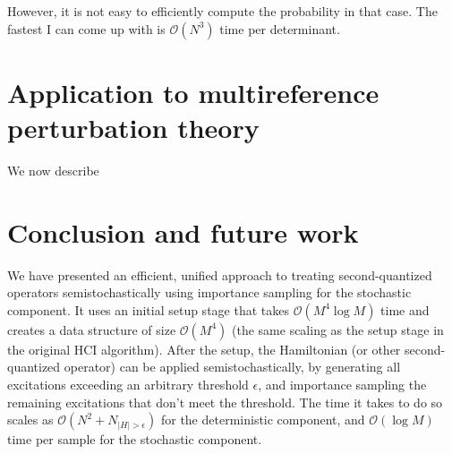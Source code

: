 \documentclass[english]{article}
\begin{document}
However, it is not easy to efficiently compute the probability in that case. The fastest I can come up with is $\mathcal{O}(N^3)$ time per determinant.


\section{Application to multireference perturbation theory}
We now describe

\section{Conclusion and future work}
We have presented an efficient, unified approach to treating second-quantized operators semistochastically using importance sampling for the stochastic component. It uses an initial setup stage that takes $\mathcal{O}(M^4\log M)$ time and creates a data structure of size $\mathcal{O}(M^4)$ (the same scaling as the setup stage in the original HCI algorithm). After the setup, the Hamiltonian (or other second-quantized operator) can be applied semistochastically, by generating all excitations exceeding an arbitrary threshold $\epsilon$, and importance sampling the remaining excitations that don't meet the threshold. The time it takes to do so scales as $\mathcal{O}(N^2 + N_{|H|>\epsilon})$ for the deterministic component, and $\mathcal{O}(\log M)$ time per sample for the stochastic component.
\end{document}
